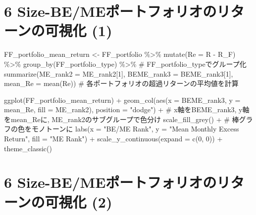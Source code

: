 \documentclass[
  letterpaper,
  DIV=11,
  numbers=noendperiod]{scrreprt}
\newenvironment{Shaded}{\begin{snugshade}}{\end{snugshade}}
\newcommand{\AttributeTok}[1]{\textcolor[rgb]{0.40,0.45,0.13}{#1}}
\newcommand{\CommentTok}[1]{\textcolor[rgb]{0.37,0.37,0.37}{#1}}
\newcommand{\DecValTok}[1]{\textcolor[rgb]{0.68,0.00,0.00}{#1}}
\newcommand{\FunctionTok}[1]{\textcolor[rgb]{0.28,0.35,0.67}{#1}}
\newcommand{\NormalTok}[1]{\textcolor[rgb]{0.00,0.23,0.31}{#1}}
\newcommand{\OtherTok}[1]{\textcolor[rgb]{0.00,0.23,0.31}{#1}}
\newcommand{\SpecialCharTok}[1]{\textcolor[rgb]{0.37,0.37,0.37}{#1}}
\newcommand{\StringTok}[1]{\textcolor[rgb]{0.13,0.47,0.30}{#1}}
\begin{document}
\section{6 Size-BE/MEポートフォリオのリターンの可視化
(1)}\label{size-bemeux30ddux30fcux30c8ux30d5ux30a9ux30eaux30aaux306eux30eaux30bfux30fcux30f3ux306eux53efux8996ux5316-1}

\begin{Shaded}
\begin{Highlighting}[]
\NormalTok{FF\_portfolio\_mean\_return }\OtherTok{\textless{}{-}}\NormalTok{ FF\_portfolio }\SpecialCharTok{\%\textgreater{}\%}
  \FunctionTok{mutate}\NormalTok{(}\AttributeTok{Re =}\NormalTok{ R }\SpecialCharTok{{-}}\NormalTok{ R\_F) }\SpecialCharTok{\%\textgreater{}\%}
  \FunctionTok{group\_by}\NormalTok{(FF\_portfolio\_type) }\SpecialCharTok{\%\textgreater{}\%} \CommentTok{\# FF\_portfolio\_typeでグループ化}
  \FunctionTok{summarize}\NormalTok{(}\AttributeTok{ME\_rank2 =}\NormalTok{ ME\_rank2[}\DecValTok{1}\NormalTok{],}
            \AttributeTok{BEME\_rank3 =}\NormalTok{ BEME\_rank3[}\DecValTok{1}\NormalTok{],}
            \AttributeTok{mean\_Re =} \FunctionTok{mean}\NormalTok{(Re)) }\CommentTok{\# 各ポートフォリオの超過リターンの平均値を計算}

\FunctionTok{ggplot}\NormalTok{(FF\_portfolio\_mean\_return) }\SpecialCharTok{+} 
  \FunctionTok{geom\_col}\NormalTok{(}\FunctionTok{aes}\NormalTok{(}\AttributeTok{x =}\NormalTok{ BEME\_rank3, }\AttributeTok{y =}\NormalTok{ mean\_Re, }\AttributeTok{fill =}\NormalTok{ ME\_rank2), }\AttributeTok{position =} \StringTok{"dodge"}\NormalTok{) }\SpecialCharTok{+} \CommentTok{\# x軸をBEME\_rank3, y軸をmean\_Reに, ME\_rank2のサブグループで色分け}
  \FunctionTok{scale\_fill\_grey}\NormalTok{() }\SpecialCharTok{+} \CommentTok{\# 棒グラフの色をモノトーンに}
  \FunctionTok{labs}\NormalTok{(}\AttributeTok{x =} \StringTok{"BE/ME Rank"}\NormalTok{, }\AttributeTok{y =} \StringTok{"Mean Monthly Excess Return"}\NormalTok{, }\AttributeTok{fill =} \StringTok{"ME Rank"}\NormalTok{) }\SpecialCharTok{+} 
  \FunctionTok{scale\_y\_continuous}\NormalTok{(}\AttributeTok{expand =} \FunctionTok{c}\NormalTok{(}\DecValTok{0}\NormalTok{, }\DecValTok{0}\NormalTok{)) }\SpecialCharTok{+} 
  \FunctionTok{theme\_classic}\NormalTok{()}
\end{Highlighting}
\end{Shaded}

\section{6 Size-BE/MEポートフォリオのリターンの可視化
(2)}\label{size-bemeux30ddux30fcux30c8ux30d5ux30a9ux30eaux30aaux306eux30eaux30bfux30fcux30f3ux306eux53efux8996ux5316-2}
\end{document}
